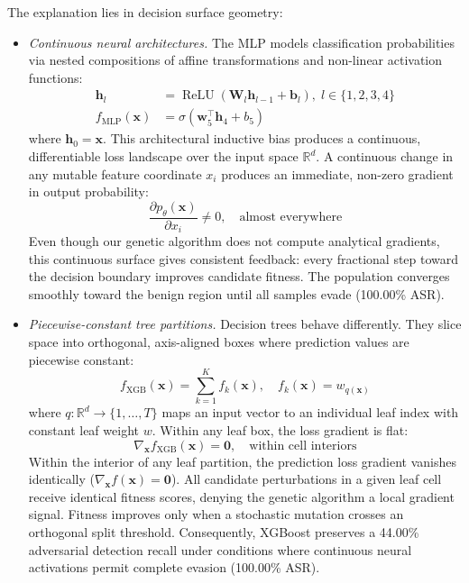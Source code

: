 \documentclass[iicol,pdflatex,sn-mathphys-num]{sn-jnl}
\begin{document}
The explanation lies in decision surface geometry:
\begin{itemize}
    \item \textit{Continuous neural architectures.} The MLP models classification probabilities via nested compositions of affine transformations and non-linear activation functions:
    \begin{align}
        \mathbf{h}_l &= \operatorname{ReLU}(\mathbf{W}_l \mathbf{h}_{l-1} + \mathbf{b}_l),\; l \in \{1, 2, 3, 4\} \\
        f_{\text{MLP}}(\mathbf{x}) &= \sigma\!\left(\mathbf{w}_5^\top \mathbf{h}_4 + b_5\right)
    \end{align}
    where $\mathbf{h}_0 = \mathbf{x}$.
    This architectural inductive bias produces a continuous, differentiable loss landscape over the input space $\mathbb{R}^d$. A continuous change in any mutable feature coordinate $x_i$ produces an immediate, non-zero gradient in output probability:
    \begin{equation}
        \frac{\partial p_\theta(\mathbf{x})}{\partial x_i} \neq 0, \quad \text{almost everywhere}
    \end{equation}
    Even though our genetic algorithm does not compute analytical gradients, this continuous surface gives consistent feedback: every fractional step toward the decision boundary improves candidate fitness. The population converges smoothly toward the benign region until all samples evade (100.00\% ASR).
    \item \textit{Piecewise-constant tree partitions.} Decision trees behave differently. They slice space into orthogonal, axis-aligned boxes where prediction values are piecewise constant:
    \begin{equation}
        f_{\text{XGB}}(\mathbf{x}) = \sum_{k=1}^K f_k(\mathbf{x}), \quad f_k(\mathbf{x}) = w_{q(\mathbf{x})}
    \end{equation}
    where $q: \mathbb{R}^d \rightarrow \{1, \dots, T\}$ maps an input vector to an individual leaf index with constant leaf weight $w$. Within any leaf box, the loss gradient is flat:
    \begin{equation}
        \nabla_{\mathbf{x}} f_{\text{XGB}}(\mathbf{x}) = \mathbf{0}, \quad \text{within cell interiors}
    \end{equation}
    Within the interior of any leaf partition, the prediction loss gradient vanishes identically ($\nabla_{\mathbf{x}} f(\mathbf{x}) = \mathbf{0}$). All candidate perturbations in a given leaf cell receive identical fitness scores, denying the genetic algorithm a local gradient signal. Fitness improves only when a stochastic mutation crosses an orthogonal split threshold. Consequently, XGBoost preserves a 44.00\% adversarial detection recall under conditions where continuous neural activations permit complete evasion (100.00\% ASR).
\end{itemize}
\end{document}
